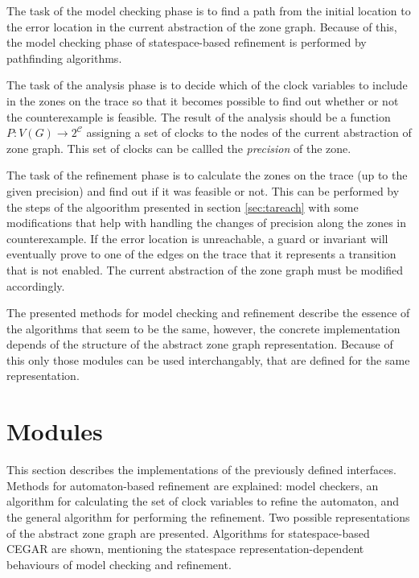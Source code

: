 The task of the model checking phase is to find a path from the initial location to the error location in the current abstraction of the zone graph. Because of this, the model checking phase of statespace-based refinement is performed by pathfinding algorithms.

The task of the analysis phase is to decide which of the clock variables to include in the zones on the trace so that it becomes possible to find out whether or not the counterexample is feasible. The result of the analysis should be a function $P: V(G) \to 2^\mathcal{C}$ assigning a set of clocks to the nodes of the current abstraction of zone graph. This set of clocks can be callled the \emph{precision} of the zone.

The task of the refinement phase is to calculate the zones on the trace (up to the given precision) and find out if it was feasible or not. This can be performed by the steps of the algoorithm presented in section \ref{sec:tareach} with some modifications that help with handling the changes of precision along the zones in counterexample. If the error location is unreachable, a guard or invariant will eventually prove to one of the edges on the trace that it represents a transition that is not enabled. The current abstraction of the zone graph must be modified accordingly.


The presented methods for model checking and refinement describe the essence of the algorithms that seem to be the same, however, the concrete implementation depends of the structure of the abstract zone graph representation. Because of this only those modules can be used interchangably, that are defined for the same representation.


\section{Modules}

This section describes the implementations of the previously defined interfaces. Methods for automaton-based refinement are explained: model checkers, an algorithm for calculating the set of clock variables to refine the automaton, and the general algorithm for performing the refinement. Two possible representations of the abstract zone graph are presented. Algorithms for statespace-based CEGAR are shown, mentioning the statespace representation-dependent behaviours of model checking and refinement.

